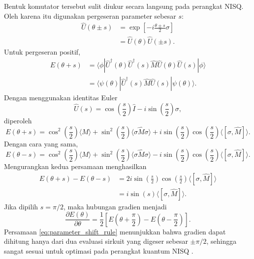 Bentuk komutator tersebut sulit diukur secara langsung pada perangkat NISQ. Oleh karena itu digunakan pergeseran parameter sebesar $s$:
\begin{equation}
    \begin{split}
    \hat{U}(\theta\pm s)
    &=
    \exp\left[
    -i\frac{\theta\pm s}{2}\sigma
    \right] \\
    &=
    \hat{U}(\theta)\hat{U}(\pm s).
    \end{split}
\end{equation}
Untuk pergeseran positif,
\begin{equation}
    \begin{split}
    E(\theta+s)
    &=
    \langle \phi|
    \hat{U}^{\dagger}(\theta)
    \hat{U}^{\dagger}(s)
    \hat{M}
    \hat{U}(\theta)
    \hat{U}(s)
    |\phi\rangle \\
    &=
    \langle \psi(\theta)|
    \hat{U}^{\dagger}(s)
    \hat{M}
    \hat{U}(s)
    |\psi(\theta)\rangle.
    \end{split}
\end{equation}
Dengan menggunakan identitas Euler
\begin{equation}
    \hat{U}(s)
    =
    \cos\left(\frac{s}{2}\right)\hat{I}
    -
    i\sin\left(\frac{s}{2}\right)\sigma,
\end{equation}
diperoleh
\begin{equation}
    E(\theta+s)
    =
    \cos^2\left(\frac{s}{2}\right)\langle\hat{M}\rangle
    +
    \sin^2\left(\frac{s}{2}\right)
    \langle \sigma\hat{M}\sigma\rangle
    +
    i\sin\left(\frac{s}{2}\right)
    \cos\left(\frac{s}{2}\right)
    \langle[\sigma,\hat{M}]\rangle.
\end{equation}
Dengan cara yang sama,
\begin{equation}
    E(\theta-s)
    =
    \cos^2\left(\frac{s}{2}\right)\langle\hat{M}\rangle
    +
    \sin^2\left(\frac{s}{2}\right)
    \langle \sigma\hat{M}\sigma\rangle
    -
    i\sin\left(\frac{s}{2}\right)
    \cos\left(\frac{s}{2}\right)
    \langle[\sigma,\hat{M}]\rangle.
\end{equation}
Mengurangkan kedua persamaan menghasilkan
\begin{equation}
    \begin{split}
    E(\theta+s)-E(\theta-s)
    &=
    2i
    \sin\left(\frac{s}{2}\right)
    \cos\left(\frac{s}{2}\right)
    \langle[\sigma,\hat{M}]\rangle \\
    &=
    i\sin(s)\langle[\sigma,\hat{M}]\rangle.
    \end{split}
\end{equation}
Jika dipilih $s=\pi/2$, maka hubungan gradien menjadi
\begin{equation}
\label{eq:parameter_shift_rule}
\frac{\partial E(\theta)}{\partial \theta}
=
\frac{1}{2}
\left[
E\left(\theta+\frac{\pi}{2}\right)
-
E\left(\theta-\frac{\pi}{2}\right)
\right].
\end{equation}
Persamaan \eqref{eq:parameter_shift_rule} menunjukkan bahwa gradien dapat dihitung hanya dari dua evaluasi sirkuit yang digeser sebesar $\pm \pi/2$, sehingga sangat sesuai untuk optimasi pada perangkat kuantum NISQ .

